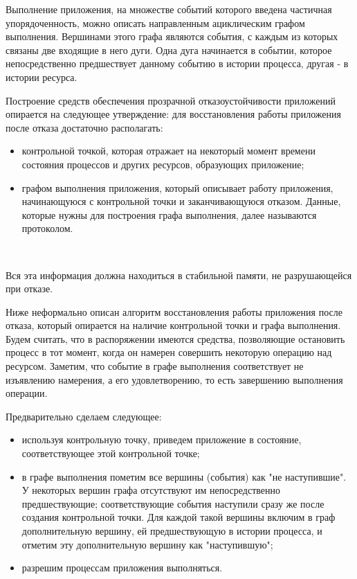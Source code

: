 \begin{multicols}{2}
Выполнение приложения, на множестве событий которого введена частичная упорядоченность, можно описать направленным ациклическим графом выполнения. Вершинами этого графа являются события, с каждым  из которых связаны две входящие в него дуги. Одна дуга начинается в событии, которое непосредственно предшествует данному событию в истории процесса, другая - в истории ресурса.

Построение средств обеспечения прозрачной отказоустойчивости приложений опирается на следующее утверждение: для восстановления работы приложения после отказа достаточно располагать:
\begin{itemize}
\item контрольной точкой, которая отражает на некоторый момент времени состояния процессов и других ресурсов, образующих приложение;
\item графом выполнения приложения, который описывает работу приложения, начинающуюся с контрольной точки и заканчивающуюся отказом. Данные, которые нужны для построения графа выполнения, далее называются протоколом.
\end{itemize}
\begin{figure*} %
\vspace*{1pt}
\begin{center}
\mbox{%
\epsfxsize=1.6in
\epsfxsize=100mm
}
\end{center}
\vspace*{-9pt}
\vspace*{-3pt}
\end{figure*}

Вся эта информация должна находиться в стабильной памяти, не разрушающейся при отказе.

Ниже неформально описан алгоритм восстановления работы приложения после отказа, который опирается на наличие контрольной точки и графа выполнения. Будем считать, что в распоряжении имеются средства, позволяющие остановить процесс в тот момент, когда он намерен совершить некоторую операцию над ресурсом. Заметим, что событие в графе выполнения соответствует не изъявлению намерения, а его удовлетворению, то есть завершению выполнения операции.

Предварительно сделаем следующее:
\begin{itemize}
\item используя контрольную точку, приведем приложение в состояние, соответствующее этой контрольной точке;
\item в графе выполнения пометим все вершины (события) как "не наступившие". У некоторых вершин графа отсутствуют им непосредственно предшествующие; соответствующие события наступили сразу же после создания контрольной точки. Для каждой такой вершины включим в граф дополнительную вершину, ей предшествующую в истории процесса, и отметим эту дополнительную вершину как "наступившую";
\item разрешим процессам приложения выполняться.
\end{itemize}


\end{multicols}
